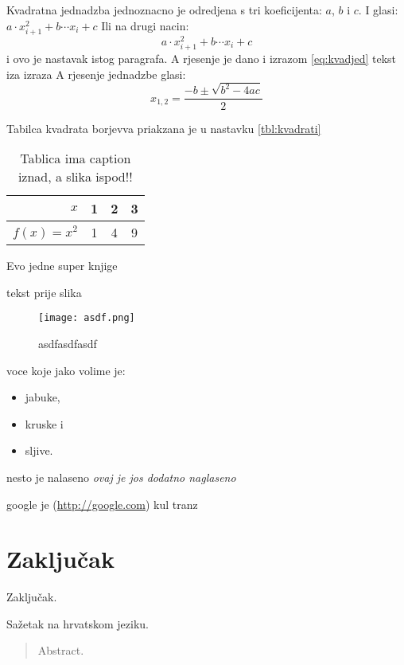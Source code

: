 \documentclass[times, utf8, zavrsni]{fer}
\begin{document}
Kvadratna jednadzba jednoznacno je odredjena s tri koeficijenta: $a$, $b$ i $c$. I glasi: $a \cdot x^2_{i + 1} + b \cdots x_i + c$
Ili na drugi nacin: \[
  a \cdot x^2_{i + 1} + b \cdots x_i + c
\]
i ovo je nastavak istog paragrafa. A rjesenje je dano i izrazom \eqref{eq:kvadjed} tekst iza izraza
A rjesenje jednadzbe glasi:
\begin{equation}
x_{1, 2} = \frac{-b \pm \sqrt{b^2 - 4ac}}{2}
\label{eq:kvadjed}
\end{equation}

Tabilca kvadrata borjevva priakzana je u nastavku \ref{tbl:kvadrati}


\begin{table}
\caption{Tablica ima caption iznad, a slika ispod!!}
\label{tbl:kvadrati2}
\centering
\begin{tabular}{r | c c c}
$x$ & 1 & 2 & 3 \\ \hline
$f(x) = x^2$ & 1 & 4 & 9
\end{tabular}
\end{table}


Evo jedne super knjige \citep{ungar2002uvod}

tekst prije slika
\begin{figure}[h!]
  \centering
  \texttt{[image: asdf.png]}
  \caption{asdfasdfasdf}
  \label{fig:slika}
\end{figure}


voce koje jako volime je:
\begin{itemize}
  \item jabuke,
  \item kruske i
  \item sljive.
\end{itemize}

nesto je nalaseno \emph{ovaj je jos \emph{dodatno} naglaseno}


google je (\url{http://google.com}) kul tranz


\chapter{Zaključak}
Zaključak.




\begin{sazetak}
Sažetak na hrvatskom jeziku.

\end{sazetak}

\begin{abstract}
Abstract.

\end{abstract}
\end{document}
